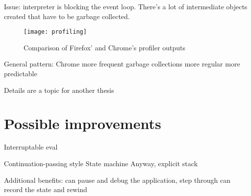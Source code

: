 Issue: interpreter is blocking the event loop.  There's a lot of intermediate
objects created that have to be garbage collected.

\begin{figure}[h!]
    \centering \texttt{[image: profiling]}
    \caption{Comparison of Firefox' and Chrome's profiler outputs}
    \label{fig:profiling}
\end{figure}

General pattern: Chrome more frequent garbage collections more regular more
predictable

Details are a topic for another thesis

\section{Possible improvements}
Interruptable eval

Continuation-passing style State machine Anyway, explicit stack

Additional benefits: can pause and debug the application, step through can
record the state and rewind
